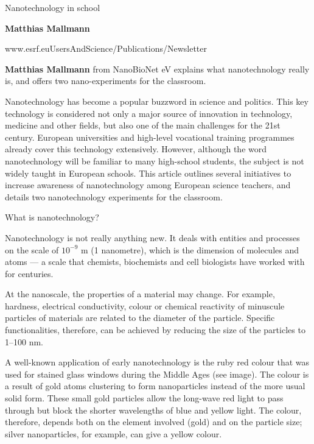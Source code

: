 \documentclass[a4paper]{article}
\newcommand\Math[1]{$\mathrm{#1}$}
\begin{document}
\begin{center}
  Nanotechnology in school
\end{center}

\begin{flushright}
  \textbf{Matthias Mallmann}

  www.esrf.euUsersAndScience/Publications/Newsletter
\end{flushright}

\textbf{Matthias Mallmann} from NanoBioNet eV explains what nanotechnology
really is, and offers two nano-experiments for the classroom.

Nanotechnology has become a popular buzzword in science and politics. This key
technology is considered not only a major source of innovation in technology,
medicine and other fields, but also one of the main challenges for the 21st
century. European universities and high-level vocational training programmes
already cover this technology extensively. However, although the word
nanotechnology will be familiar to many high-school students, the subject is not
widely taught in European schools. This article outlines several initiatives to
increase awareness of nanotechnology among European science teachers, and
details two nanotechnology experiments for the classroom.

What is nanotechnology?

Nanotechnology is not really anything new. It deals with entities and processes
on the scale of \Math{10^{-9}} m (1 nanometre), which is the dimension of
molecules and atoms --- a scale that chemists, biochemists and cell biologists
have worked with for centuries.

At the nanoscale, the properties of a material may change. For example,
hardness, electrical conductivity, colour or chemical reactivity of minuscule
particles of materials are related to the diameter of the particle. Specific
functionalities, therefore, can be achieved by reducing the size of the
particles to 1--100 nm.

A well-known application of early nanotechnology is the ruby red colour that was
used for stained glass windows during the Middle Ages (see image). The colour is
a result of gold atoms clustering to form nanoparticles instead of the more
usual solid form. These small gold particles allow the long-wave red light to
pass through but block the shorter wavelengths of blue and yellow light. The
colour, therefore, depends both on the element involved (gold) and on the
particle size; silver nanoparticles, for example, can give a yellow colour.
\end{document}
